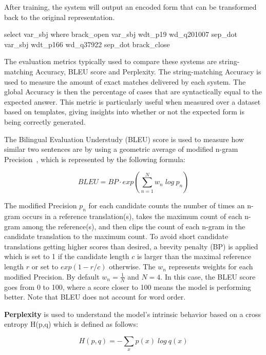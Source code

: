 After training, the system will output an encoded form that can be transformed back to the 
original \SPARQL{} representation. 

\begin{sparqlcode}[%
    caption={\SPARQL{} query after encoding (note it excludes the \texttt{PREFIX} clauses).}, 
    label={lst:encodedWikidataSparqlExample}]
select var_sbj where brack_open var_sbj wdt_p19 wd_q201007 sep_dot var_sbj wdt_p166 wd_q37922 sep_dot brack_close
\end{sparqlcode}

The evaluation metrics typically used to compare these systems are string-matching Accuracy, 
BLEU score and Perplexity. The string-matching Accuracy is used to measure the amount of exact 
matches delivered by each system. The global Accuracy is then the percentage of cases that are 
syntactically equal to the expected answer. This metric is particularly useful when measured 
over a dataset based on \SPARQL{} templates, giving insights into whether or not the expected 
\SPARQL{} form is being correctly generated.

The Bilingual Evaluation Understudy (BLEU) score is used to measure how similar two sentences 
are by using a geometric average of modified n-gram Precision~\cite{nlToSparql:PapineniRWZ02}, 
which is represented by the following formula:

\[
    BLEU = BP \cdot exp(\sum_{n=1}^N w_n \; log \: p_n)    
\]

The modified Precision $p_n$ for each candidate counts the number of times an n-gram occurs in a 
reference translation(s), takes the maximum count of each n-gram among the reference(s), and 
then clips the count of each n-gram in the candidate translation to the maximum count. To avoid 
short candidate translations getting higher scores than desired, a brevity penalty (BP) is 
applied which is set to 1 if the candidate length $c$ is larger than the maximal reference 
length $r$ or set to $exp(1-r/c)$ otherwise. The $w_n$ represents weights for each modified 
Precision. By default $w_n=\frac{1}{N}$ and $N=4$. In this case, the BLEU score goes from 0 to 
100, where a score closer to 100 means the model is performing better. Note that BLEU does not 
account for word order. 

\textbf{Perplexity} is used to understand the model’s intrinsic behavior based on a cross 
entropy H(p,q) which is defined as follows:

\[
    H(p,q)= -\sum_x p(x) \; log \: q(x)
\]

